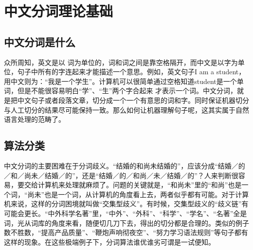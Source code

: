 \documentclass[bachelor,winfonts]{jnuthesis}
\begin{document}
\section{中文分词理论基础}
\subsection{中文分词是什么}
众所周知，英文是以 词为单位的，词和词之间是靠空格隔开，而中文是以字为单位，句子中所有的字连起来才能描述一个意思。例如，英文句子I am a student，用中文则为：“我是一个学生”。计算机可以很简单通过空格知道student是一个单词，但是不能很容易明白“学”、“生”两个字合起来 才表示一个词。中文分词，就是把中文句子或者段落文章，切分成一个一个有意思的词和字。同时保证机器切分与人工切分的结果尽可能保持一致。那么如何让机器理解句子呢，这其实属于自然语言处理的范畴了。

\subsection{算法分类}
中文分词的主要困难在于分词歧义\cite{matrix-blog}。“结婚的和尚未结婚的”，应该分成“结婚／的／和／尚未／结婚／的”，还是“结婚／的／和尚／未／结婚／的”？人来判断很容易，要交给计算机来处理就麻烦了。问题的关键就是，“和尚未”里的“和尚”也是一个词，“尚未”也是一个词，从计算机的角度看上去，两者似乎都有可能。对于计算机来说，这样的分词困境就叫做“交集型歧义”。有时候，交集型歧义的“歧义链”有可能会更长。“中外科学名著”里，“中外”、“外科”、“科学”、“学名”、“名著”全是词，光从词库的角度来看，随便切几刀下去，得出的切分都是合理的。类似的例子数不胜数，“提高产品质量”、“鞭炮声响彻夜空”、“努力学习语法规则”等句子都有这样的现象。在这些极端例子下，分词算法谁优谁劣可谓是一试便知。
\end{document}
